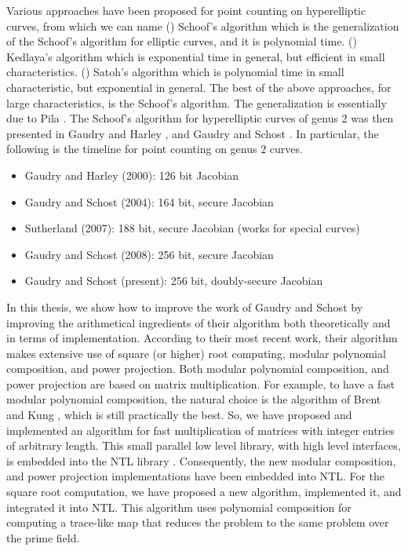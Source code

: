 Various approaches have been proposed for point counting on hyperelliptic curves, from which we can 
name (\textbf{}) Schoof's algorithm which is the generalization of the Schoof's algorithm 
for elliptic curves, and it is polynomial time. (\textbf{}) Kedlaya's algorithm 
\cite{Kedlaya2001} which is exponential time in general, but efficient in small characteristics. 
(\textbf{}) Satoh's algorithm \cite{Satoh2000} which is polynomial time in small 
characteristic, but exponential in general. The best of the above approaches, for large 
characteristics, is the Schoof's algorithm. The generalization is essentially due to Pila 
\cite{Pila1990}. The Schoof's algorithm for hyperelliptic curves of genus 2 was then presented in 
Gaudry and Harley \cite{GauHar2000}, and Gaudry and Schost \cite{GauSch2004, GASC2010}. In 
particular, the following is the timeline for point counting on genus $2$ curves.
\begin{itemize}
\item Gaudry and Harley (2000): 126 bit Jacobian
\item Gaudry and Schost (2004): 164 bit, secure Jacobian
\item Sutherland (2007): 188 bit, secure Jacobian (works for special curves)
\item Gaudry and Schost (2008): 256 bit, secure Jacobian
\item Gaudry and Schost (present): 256 bit, doubly-secure Jacobian
\end{itemize}
In this thesis, we show how to improve the work of Gaudry and Schost by improving the arithmetical 
ingredients of their algorithm both theoretically and in terms of implementation. According to their 
most recent work, their algorithm makes extensive use of square (or higher) root computing, modular 
polynomial composition, and power projection. Both modular polynomial composition, and power 
projection are based on  matrix multiplication. For example, to have a fast modular polynomial 
composition, the natural choice is the algorithm of Brent and Kung \cite{BreKun1978}, which is still 
practically the best. So, we have  proposed and implemented an algorithm for fast multiplication of 
matrices with integer entries of arbitrary length. This small parallel low level library, with high 
level interfaces, is embedded into the NTL library \cite{NTL2009}. Consequently, the new modular 
composition, and power projection implementations have been embedded into NTL. For the square root 
computation, we have proposed a new algorithm, implemented it, and integrated it into NTL. This 
algorithm uses polynomial composition for computing a trace-like map that reduces the problem to the 
same problem over the prime field.

